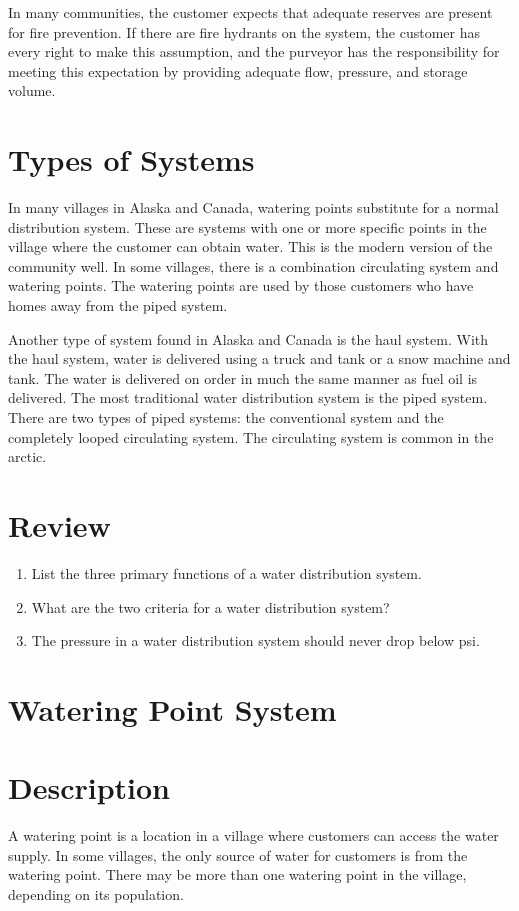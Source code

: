 \documentclass[10pt]{article}
\begin{document}
In many communities, the customer expects that adequate reserves are present for fire prevention. If there are fire hydrants on the system, the customer has every right to make this assumption, and the purveyor has the responsibility for meeting this expectation by providing adequate flow, pressure, and storage volume.

\section{Types of Systems}
In many villages in Alaska and Canada, watering points substitute for a normal distribution system. These are systems with one or more specific points in the village where the customer can obtain water. This is the modern version of the community well. In some villages, there is a combination circulating system and watering points. The watering points are used by those customers who have homes away from the piped system.

Another type of system found in Alaska and Canada is the haul system. With the haul system, water is delivered using a truck and tank or a snow machine and tank. The water is delivered on order in much the same manner as fuel oil is delivered. The most traditional water distribution system is the piped system. There are two types of piped systems: the conventional system and the completely looped circulating system. The circulating system is common in the arctic.

\section{Review}
\begin{enumerate}
  \item List the three primary functions of a water distribution system.

  \item What are the two criteria for a water distribution system?

  \item The pressure in a water distribution system should never drop below psi.

\end{enumerate}
\section{Watering Point System}
\section{Description}
A watering point is a location in a village where customers can access the water supply. In some villages, the only source of water for customers is from the watering point. There may be more than one watering point in the village, depending on its population.
\end{document}
